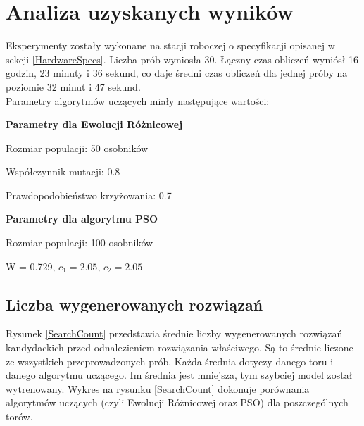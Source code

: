\section{Analiza uzyskanych wyników}
Eksperymenty zostały wykonane na stacji roboczej o specyfikacji opisanej w sekcji \ref{HardwareSpecs}. Liczba prób wyniosła 30. Łączny czas obliczeń wyniósł 16 godzin, 23 minuty i 36 sekund, co daje średni czas obliczeń dla jednej próby na poziomie 32 minut i 47 sekund. \\
Parametry algorytmów uczących miały następujące wartości:
\begin{enumerate*}
\item \textbf{Parametry dla Ewolucji Różnicowej}
\begin{itemize*}
\item Rozmiar populacji: 50 osobników
\item Współczynnik mutacji: 0.8
\item Prawdopodobieństwo krzyżowania: 0.7
\end{itemize*}
\item \textbf{Parametry dla algorytmu PSO}
\begin{itemize*}
\item Rozmiar populacji: 100 osobników
\item W = 0.729, $c_1 = 2.05$, $c_2 = 2.05$
\end{itemize*}
\end{enumerate*}

\subsection{Liczba wygenerowanych rozwiązań}
Rysunek \ref{SearchCount} przedstawia średnie liczby wygenerowanych rozwiązań kandydackich przed odnalezieniem rozwiązania właściwego. Są to średnie liczone ze wszystkich przeprowadzonych prób. Każda średnia dotyczy danego toru i danego algorytmu uczącego. Im średnia jest mniejsza, tym szybciej model został wytrenowany. Wykres na rysunku \ref{SearchCount} dokonuje porównania algorytmów uczących (czyli Ewolucji Różnicowej oraz PSO) dla poszczególnych torów.

